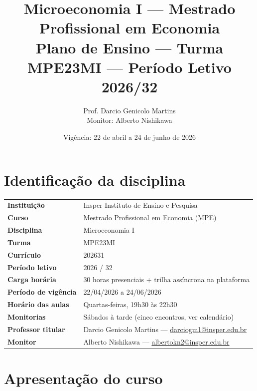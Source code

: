 \documentclass[11pt,a4paper]{article}
\title{\color{insperred}\bfseries
  Microeconomia I --- Mestrado Profissional em Economia\\[2pt]
  \large\mdseries Plano de Ensino --- Turma MPE23MI --- Período Letivo 2026/32}
\author{Prof. Darcio Genicolo Martins \\ Monitor: Alberto Nishikawa}
\date{Vigência: 22 de abril a 24 de junho de 2026}
\begin{document}

\maketitle
\thispagestyle{fancy}

\section*{\color{insperred}Identificação da disciplina}

\begin{tabularx}{\textwidth}{@{}l X@{}}
\toprule
\textbf{Instituição}        & Insper Instituto de Ensino e Pesquisa \\
\textbf{Curso}              & Mestrado Profissional em Economia (MPE) \\
\textbf{Disciplina}         & Microeconomia I \\
\textbf{Turma}              & MPE23MI \\
\textbf{Currículo}          & 202631 \\
\textbf{Período letivo}     & 2026 / 32 \\
\textbf{Carga horária}      & 30 horas presenciais + trilha assíncrona na plataforma \\
\textbf{Período de vigência}& 22/04/2026 a 24/06/2026 \\
\textbf{Horário das aulas}  & Quartas-feiras, 19h30 às 22h30 \\
\textbf{Monitorias}         & Sábados à tarde (cinco encontros, ver calendário) \\
\textbf{Professor titular}  & Darcio Genicolo Martins --- \href{mailto:darciogm1@insper.edu.br}{darciogm1@insper.edu.br} \\
\textbf{Monitor}            & Alberto Nishikawa --- \href{mailto:albertokn2@insper.edu.br}{albertokn2@insper.edu.br} \\
\bottomrule
\end{tabularx}

\vspace{1em}

\section{Apresentação do curso}
\end{document}
